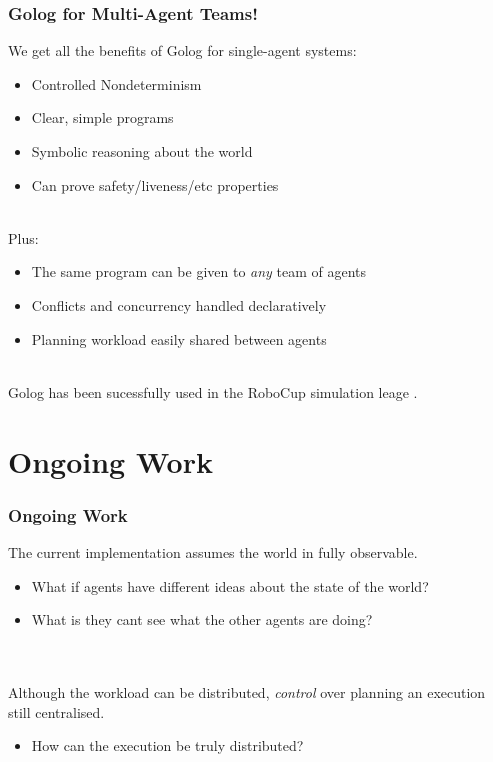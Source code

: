 \documentclass{beamer}
\begin{document}
\begin{frame}
\frametitle{Golog for Multi-Agent Teams!}
We get all the benefits of Golog for single-agent systems:
\begin{itemize}
  \item Controlled Nondeterminism
  \item Clear, simple programs
  \item Symbolic reasoning about the world
  \item Can prove safety/liveness/etc properties
\end{itemize}
\ \\
Plus:
\begin{itemize}
  \item The same program can be given to \emph{any} team of agents
  \item Conflicts and concurrency handled declaratively
  \item Planning workload easily shared between agents
\end{itemize}
\ \\
Golog has been sucessfully used in the RoboCup simulation leage \cite{Ferrein2005readylog}.
\end{frame}


\section{Ongoing Work}

\begin{frame}
\frametitle{Ongoing Work}

The current implementation assumes the world in fully observable.
\begin{itemize}
  \item What if agents have different ideas about the state of the world?
  \item What is they cant see what the other agents are doing?
\end{itemize}
\ \\
\ \\
Although the workload can be distributed, \emph{control} over planning 
an execution still centralised.

\begin{itemize}
  \item How can the execution be truly distributed?
\end{itemize}
\end{frame}
\end{document}
